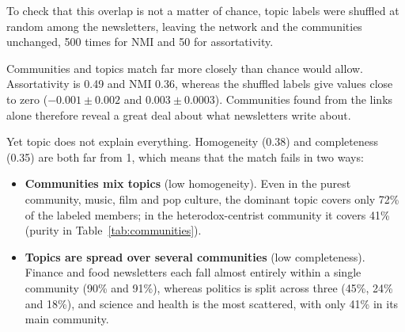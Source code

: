 \documentclass[sigchi]{acmart}
\begin{document}
To check that this overlap is not a matter of chance, topic labels were
shuffled at random among the newsletters, leaving the network and the
communities unchanged, 500 times for NMI and 50 for assortativity.

Communities and topics match far more closely than chance would allow.
Assortativity is 0.49 and NMI 0.36, whereas the shuffled labels give
values close to zero ($-0.001 \pm 0.002$ and $0.003 \pm 0.0003$).
Communities found from the links alone therefore reveal a great deal
about what newsletters write about.

Yet topic does not explain everything. Homogeneity (0.38) and
completeness (0.35) are both far from 1, which means that the match
fails in two ways:
\begin{itemize}
    \item \textbf{Communities mix topics} (low homogeneity). Even in the purest community, music, film and pop culture, the dominant topic
  covers only 72\% of the labeled members; in the heterodox-centrist
  community it covers 41\% (purity in Table~\ref{tab:communities}).
  \item \textbf{Topics are spread over several communities} (low
  completeness). Finance and food newsletters each fall almost entirely
  within a single community (90\% and 91\%), whereas politics is split
  across three (45\%, 24\% and 18\%), and science and health is the most
  scattered, with only 41\% in its main community.
\end{itemize}
\end{document}
